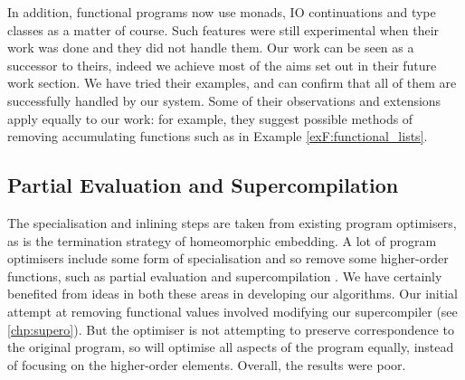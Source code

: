 In addition, functional programs now use monads, IO continuations and type classes as a matter of course. Such features were still experimental when their work was done and they did not handle them. Our work can be seen as a successor to theirs, indeed we achieve most of the aims set out in their future work section. We have tried their examples, and can confirm that all of them are successfully handled by our system. Some of their observations and extensions apply equally to our work: for example, they suggest possible methods of removing accumulating functions such as in Example \ref{exF:functional_lists}.

\subsection{Partial Evaluation and Supercompilation}

The specialisation and inlining steps are taken from existing program optimisers, as is the termination strategy of homeomorphic embedding. A lot of program optimisers include some form of specialisation and so remove some higher-order functions, such as partial evaluation \cite{jones:partial_evaluation} and supercompilation \cite{supercompilation}. We have certainly benefited from ideas in both these areas in developing our algorithms. Our initial attempt at removing functional values involved modifying our supercompiler (see \ref{chp:supero}). But the optimiser is not attempting to preserve correspondence to the original program, so will optimise all aspects of the program equally, instead of focusing on the higher-order elements. Overall, the results were poor.

